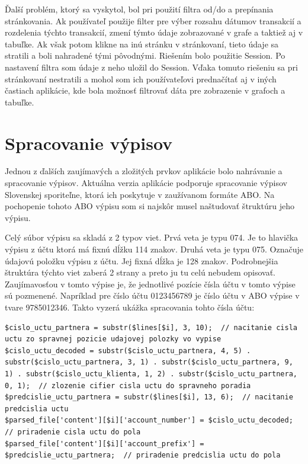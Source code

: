 \documentclass[12pt,oneside]{book}
\begin{document}
Ďalší problém, ktorý sa vyskytol, bol pri použití filtra od/do a prepínania stránkovania. Ak používateľ použije filter pre výber rozsahu dátumov transakcií a rozdelenia týchto transakcií, zmení týmto údaje zobrazované v grafe a taktiež aj v tabuľke. Ak však potom klikne na inú stránku v stránkovaní, tieto údaje sa stratili a boli nahradené tými pôvodnými. Riešením bolo použitie Session. Po nastavení filtra som údaje z neho uložil do Session. Vďaka tomuto riešeniu sa pri stránkovaní nestratili a mohol som ich používateľovi prednačítať aj v iných častiach aplikácie, kde bola možnosť filtrovať dáta pre zobrazenie v grafoch a tabuľke.

\section{Spracovanie výpisov}
Jednou z ďalších zaujímavých a zložitých prvkov aplikácie bolo nahrávanie a spracovanie výpisov. Aktuálna verzia aplikácie podporuje spracovanie výpisov Slovenskej sporiteľne, ktorá ich poskytuje v zaužívanom formáte ABO. Na pochopenie tohoto ABO výpisu som si najskôr musel naštudovať štruktúru jeho výpisu. 

Celý súbor výpisu sa skladá z 2 typov viet. Prvá veta je typu 074. Je to hlavička výpisu z účtu ktorá má fixnú dĺžku 114 znakov. Druhá veta je typu 075. Označuje údajovú položku výpisu z účtu. Jej fixná dĺžka je 128 znakov. Podrobnejšia štruktúra týchto viet zaberá 2 strany a preto ju tu celú nebudem opisovať. Zaujímavosťou v tomto výpise je, že jednotlivé pozície čísla účtu v tomto výpise sú pozmenené. Napríklad pre číslo účtu 0123456789 je číslo účtu v ABO výpise v tvare 9785012346. Takto vyzerá ukážka spracovania tohto čísla účtu:
\begin{lstlisting}
$cislo_uctu_partnera = substr($lines[$i], 3, 10);  // nacitanie cisla uctu zo spravnej pozicie udajovej polozky vo vypise
$cislo_uctu_decoded = substr($cislo_uctu_partnera, 4, 5) . substr($cislo_uctu_partnera, 3, 1) . substr($cislo_uctu_partnera, 9, 1) . substr($cislo_uctu_klienta, 1, 2) . substr($cislo_uctu_partnera, 0, 1);  // zlozenie cifier cisla uctu do spravneho poradia 
$predcislie_uctu_partnera = substr($lines[$i], 13, 6);  // nacitanie predcislia uctu
$parsed_file['content'][$i]['account_number'] = $cislo_uctu_decoded;  // priradenie cisla uctu do pola
$parsed_file['content'][$i]['account_prefix'] = $predcislie_uctu_partnera;  // priradenie predcislia uctu do pola
\end{lstlisting}
\end{document}
